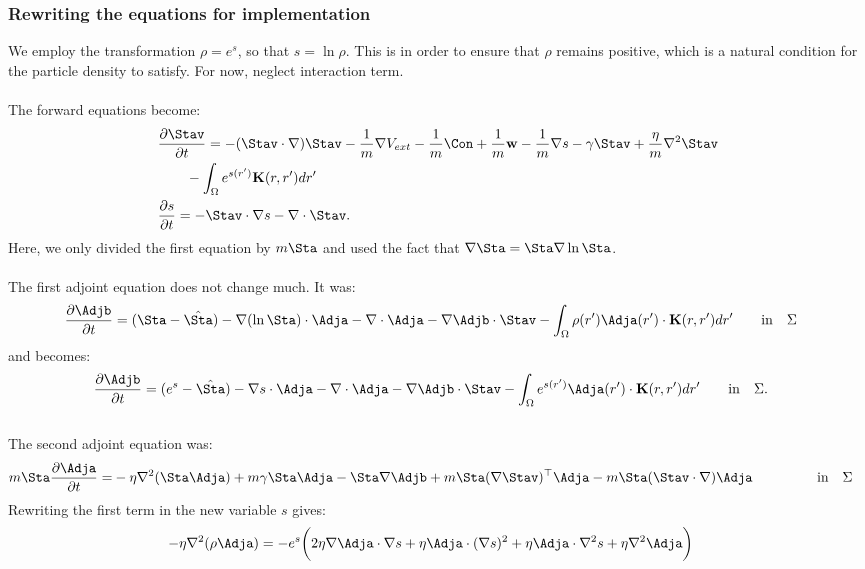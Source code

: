 \subsubsection{Rewriting the equations for implementation}
We employ the transformation $\rho = e^s$, so that $s = \ln \rho$. This is in order to ensure that $\rho$ remains positive, which is a natural condition for the particle density to satisfy. For now, neglect interaction term.
\\
\\
The forward equations become:
\begin{align}
& \frac{\partial \Stav}{\partial t}= -  (\Stav \cdot \nabla)\Stav - \frac{1}{m} \nabla V_{ext} -\frac{1}{m}\Con +\frac{1}{m} \mathbf{w} - \frac{1}{m} \nabla s - \gamma \Stav +  \frac{\eta}{m} \nabla^2 \Stav \label{eqn:INreducedv1}\\
&\quad \quad  -\int_\Omega e^{s(r')} \mathbf{K}(r,r')dr'\\
 &\frac{\partial s}{\partial t} = - \Stav \cdot \nabla s - \nabla \cdot \Stav \label{eqn:INreducedrho1} .
\end{align}
Here, we only divided the first equation by $m \Sta$ and used the fact that $\nabla \Sta = \Sta \nabla \ln \Sta$.\\
\\
The first adjoint equation does not change much. It was: 
\begin{align*}
& \frac{\partial \Adjb}{\partial t} = (\Sta - \hat \Sta) - \nabla (\ln \Sta)\cdot \Adja -\nabla\cdot \Adja  -  \nabla \Adjb \cdot \Stav  - \int_\Omega  \rho(r')\Adja(r') \cdot\mathbf{K}(r,r')   dr' \qquad \text{in} \quad \Sigma 
\end{align*}
and becomes:
\begin{align*}
& \frac{\partial \Adjb}{\partial t} = (e^s - \hat \Sta) - \nabla s \cdot \Adja -\nabla\cdot \Adja  -  \nabla \Adjb \cdot \Stav  - \int_\Omega  e^{s(r')}\Adja(r') \cdot\mathbf{K}(r,r')   dr' \qquad \text{in} \quad \Sigma. 
\end{align*}
\\
The second adjoint equation was:
\begin{align*}
m\Sta \frac{\partial \Adja}{\partial t} =& - \eta \nabla^2 (\Sta \Adja)   +m \gamma \Sta \Adja-\Sta\nabla \Adjb +m \Sta (\nabla \Stav)^\top\Adja -m \Sta (\Stav \cdot \nabla)\Adja   \ \qquad\qquad \  \text{in} \quad \Sigma
\end{align*}
Rewriting the first term in the new variable $s$ gives:
\begin{align*}
- \eta \nabla^2 (\rho \Adja) &= - e^s \bigg(2 \eta \nabla \Adja \cdot \nabla s + \eta \Adja \cdot (\nabla s)^2 + \eta \Adja \cdot \nabla^2 s + \eta \nabla^2 \Adja    \bigg)
\end{align*}
